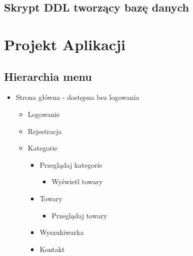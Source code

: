 \documentclass[10pt,a4paper]{article}
\begin{document}
      \newpage
      \subsection{Skrypt DDL tworzący bazę danych}
		 
		
	\newpage
	\section{Projekt Aplikacji}
	  \subsection{ Hierarchia menu}
      \small
	  \begin{itemize}
        
        \item Strona główna - dostępna bez logowania
        \begin{itemize}
          \item Logowanie
		  \item Rejestracja
		  \item Kategorie
		  \begin{itemize}
 		    \item Przeglądaj kategorie
 			  \begin{itemize}
		        \item Wyświetl towary
		      \end{itemize}
		  \item Towary
		  \begin{itemize}
		     \item Przeglądaj towary
		  \end{itemize}
		  \item Wyszukiwarka
		  \item Kontakt
	      \end{itemize}
        \end{itemize}
	    

\end{itemize}
\end{document}
